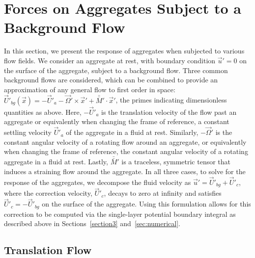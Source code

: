 \section{Forces on Aggregates Subject to a Background Flow} 
\label{sec:results}
In this section, we present the response of aggregates when subjected to various flow fields. We consider an aggregate at rest, with boundary condition $\vec{u}'=0$ on the surface of the aggregate, subject to a background flow. Three common background flows are considered, which can be combined to provide an approximation of any general flow to first order in space: $\vec{U}'_{bg}(\vec{x}) = -\vec{U}'_a - \vec{\Omega}' \times \vec{x}' + \bar{\bar{M}}' \cdot \vec{x}'$, the primes indicating dimensionless quantities as above. Here, $-\vec{U}'_a$ is the translation velocity of the flow past an aggregate or equivalently when changing the frame of reference, a constant settling velocity $\vec{U}'_a$ of the aggregate in a fluid at rest.  Similarly, $-\vec{\Omega}'$ is the constant angular velocity of a rotating flow around an aggregate, or equivalently when changing the frame of reference, the constant angular velocity of a rotating aggregate in a fluid at rest. Lastly, $\bar{\bar{M}}'$ is a traceless, symmetric tensor that induces a straining flow around the aggregate. In all three cases, to solve for the response of the aggregates, we decompose the fluid velocity as $\vec{u}' = \vec{U}'_{bg} + \vec{U}'_c$, where the correction velocity, $\vec{U}'_c$, decays to zero at infinity and satisfies $\vec{U}'_c = -\vec{U}'_{bg}$ on the surface of the aggregate. 
Using this formulation allows for this correction to be computed via the single-layer potential boundary integral as described above in Sections~\ref{section3} and~\ref{sec:numerical}.
\subsection{Translation Flow}
\label{sec:results_translationflow}

